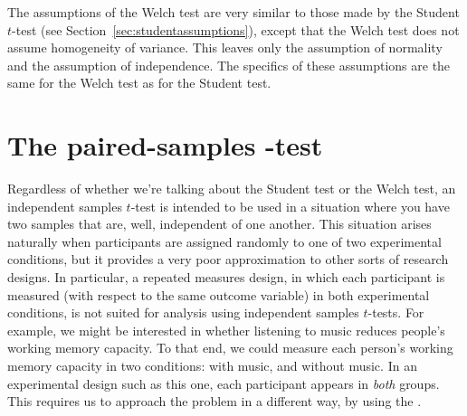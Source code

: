
The assumptions of the Welch test are very similar to those made by the Student $t$-test (see Section~\ref{sec:studentassumptions}), except that the Welch test does not assume homogeneity of variance. This leaves only the assumption of normality and the assumption of independence. The specifics of these assumptions are the same for the Welch test as for the Student test. 

\vspace*{12pt}


\section{The paired-samples \texorpdfstring{}{}-test~\label{sec:pairedsamplesttest}}

Regardless of whether we're talking about the Student test or the Welch test, an independent samples $t$-test is intended to be used in a situation where you have two samples that are, well, independent of one another. This situation arises naturally when participants are assigned randomly to one of two experimental conditions, but it provides a very poor approximation to other sorts of research designs. In particular, a repeated measures design, in which each participant is measured (with respect to the same outcome variable) in both experimental conditions, is not suited for analysis using independent samples $t$-tests. For example, we might be interested in whether listening to music reduces people's working memory capacity. To that end, we could measure each person's working memory capacity in two conditions: with music, and without music. In an experimental design such as this one, each participant appears in {\it both} groups. This requires us to approach the problem in a different way, by using the . 


